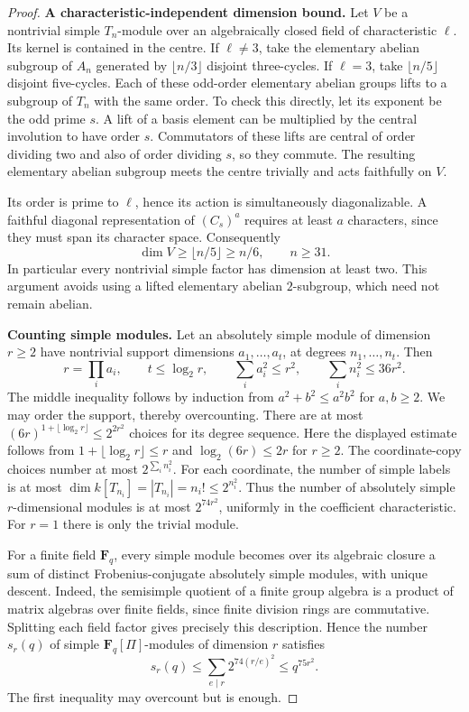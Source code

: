 \begin{proof}
\par\smallskip\noindent\textbf{A characteristic-independent dimension bound.}\quad
Let \(V\) be a nontrivial simple \(T_n\)-module over an algebraically
closed field of characteristic \(\ell\).  Its kernel is contained
in the centre.  If \(\ell\ne3\), take the elementary abelian subgroup
of \(A_n\) generated by \(\lfloor n/3\rfloor\) disjoint three-cycles.
If \(\ell=3\), take \(\lfloor n/5\rfloor\) disjoint five-cycles.
Each of these odd-order elementary abelian groups lifts to a
subgroup of \(T_n\) with the same order.  To check this directly,
let its exponent be the odd prime \(s\).  A lift of a basis
element can be multiplied by the central involution to have order
\(s\).  Commutators of these lifts are central of order dividing
two and also of order dividing \(s\), so they commute.
The resulting elementary abelian subgroup meets the centre
trivially and acts faithfully on \(V\).

Its order is prime to \(\ell\), hence its action is simultaneously
diagonalizable.  A faithful diagonal representation of
\((C_s)^a\) requires at least \(a\) characters, since they must
span its character space.  Consequently
\[
 \dim V\geq\lfloor n/5\rfloor\geq n/6,\qquad n\geq31.
 \tag{SP7}
\]
In particular every nontrivial simple factor has dimension at least
two.  This argument avoids using a lifted elementary abelian
\(2\)-subgroup, which need not remain abelian.

\par\smallskip\noindent\textbf{Counting simple modules.}\quad
Let an absolutely simple module of dimension \(r\geq2\) have
nontrivial support dimensions \(a_1,\ldots,a_t\), at degrees
\(n_1,\ldots,n_t\).  Then
\[
 r=\prod_i a_i,\qquad t\leq\log_2r,\qquad
 \sum_i a_i^2\leq r^2,\qquad \sum_i n_i^2\leq36r^2.
 \tag{SP8}
\]
The middle inequality follows by induction from
\(a^2+b^2\leq a^2b^2\) for \(a,b\geq2\).
We may order the support, thereby overcounting.  There are at most
\((6r)^{1+\lfloor\log_2r\rfloor}\leq2^{2r^2}\)
choices for its degree sequence.
Here the displayed estimate follows from
\(1+\lfloor\log_2r\rfloor\leq r\) and
\(\log_2(6r)\leq2r\) for \(r\geq2\).
The coordinate-copy choices
number at most \(2^{\sum_i n_i^2}\).
For each coordinate, the number of simple labels is at most
\(\dim k[T_{n_i}]=|T_{n_i}|=n_i!\leq2^{n_i^2}\).
Thus the number of absolutely simple \(r\)-dimensional modules is
at most \(2^{74r^2}\), uniformly in the coefficient characteristic.
For \(r=1\) there is only the trivial module.

For a finite field \(\mathbf F_q\), every simple module becomes
over its algebraic closure a sum of distinct Frobenius-conjugate
absolutely simple modules, with unique descent.  Indeed, the
semisimple quotient of a finite group algebra is a product of
matrix algebras over finite fields, since finite division rings
are commutative.  Splitting each field factor gives precisely
this description.  Hence the number \(s_r(q)\) of simple
\(\mathbf F_q[\Pi]\)-modules of dimension \(r\) satisfies
\[
 s_r(q)\leq\sum_{e\mid r}2^{74(r/e)^2}\leq q^{75r^2}.
 \tag{SP9}
\]
The first inequality may overcount but is enough.


\end{proof}
